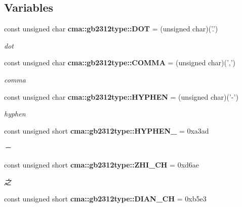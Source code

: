 \subsection*{Variables}
\begin{CompactItemize}
\item 
const unsigned char {\bf cma::gb2312type::DOT} = (unsigned char)('.')\label{namespacecma_1_1gb2312type_4c84770c03819e61f8d40adde12fe8a8}

\begin{CompactList}\small\item\em dot \item\end{CompactList}\item 
const unsigned char {\bf cma::gb2312type::COMMA} = (unsigned char)(',')\label{namespacecma_1_1gb2312type_525b45f5f2ce554f1fadf3061d1fb68a}

\begin{CompactList}\small\item\em comma \item\end{CompactList}\item 
const unsigned char {\bf cma::gb2312type::HYPHEN} = (unsigned char)('-')\label{namespacecma_1_1gb2312type_2ac4fe8f2e3b95dc8949da120084f39f}

\begin{CompactList}\small\item\em hyphen \item\end{CompactList}\item 
const unsigned short {\bf cma::gb2312type::HYPHEN\_} = 0xa3ad\label{namespacecma_1_1gb2312type_ccb4b1f9d3977eafb32f220df18d5982}

\begin{CompactList}\small\item\em － \item\end{CompactList}\item 
const unsigned short {\bf cma::gb2312type::ZHI\_\-CH} = 0xd6ae\label{namespacecma_1_1gb2312type_121c54ca2948e4f13f7dd9e54a3b0ebe}

\begin{CompactList}\small\item\em 之 \item\end{CompactList}\item 
const unsigned short {\bf cma::gb2312type::DIAN\_\-CH} = 0xb5e3\label{namespacecma_1_1gb2312type_df2457cfcc97d3fe072d0f6ac6b4e77b}


\end{CompactItemize}
